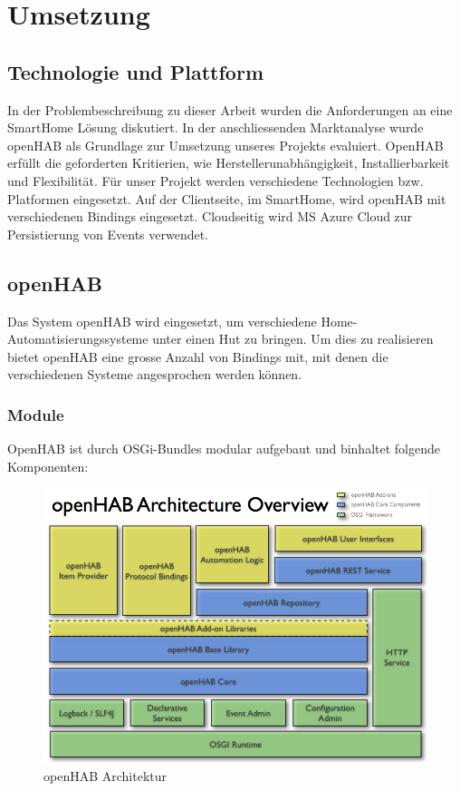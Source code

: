 \section{Umsetzung}
\subsection{Technologie und Plattform}
In der Problembeschreibung zu dieser Arbeit wurden die Anforderungen an eine SmartHome Lösung diskutiert. In der anschliessenden Marktanalyse wurde openHAB als Grundlage zur Umsetzung unseres Projekts evaluiert. OpenHAB erfüllt die geforderten Kritierien, wie Herstellerunabhängigkeit, Installierbarkeit und Flexibilität. 
Für unser Projekt werden verschiedene Technologien bzw. Platformen eingesetzt. Auf der Clientseite, im SmartHome, wird openHAB mit verschiedenen Bindings eingesetzt. Cloudseitig wird MS Azure Cloud zur Persistierung von Events verwendet.

\subsection{openHAB}
Das System openHAB wird eingesetzt, um verschiedene Home-Automatisierungssysteme unter einen Hut zu bringen. Um dies zu realisieren bietet openHAB eine grosse Anzahl von Bindings mit, mit denen die verschiedenen Systeme angesprochen werden können.

\subsubsection{Module}
OpenHAB ist durch OSGi-Bundles modular aufgebaut und binhaltet folgende Komponenten:

\begin{figure}[H]
	\centering
		\includegraphics[scale=0.45]{report/img/openHAB_architecture}
	\caption{openHAB Architektur}
	\label{fig:ohArch}
\end{figure}


